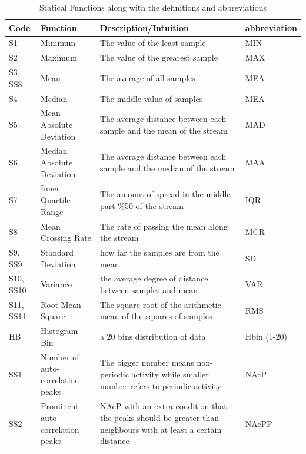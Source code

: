 \documentclass[journal,article,submit,moreauthors,pdftex]{Definitions/mdpi}
\begin{document}
\begin{table}[H]
	\caption{Statical Functions along with the definitions and abbreviations }
	\label{tab:feature_list}
	\centering
	\begin{tabular}{p{0.9cm}p{5cm}p{7cm}p{1.3cm}}
		\toprule
		\textbf{Code} & \textbf{Function} & \textbf{Description/Intuition} & \textbf{{\scriptsize abbreviation}} \\
		\midrule
		{\footnotesize S1}&Minimum & {\scriptsize The value of the least sample}& MIN\\
		S2&Maximum & {\scriptsize The value of the greatest sample}& MAX\\
		{\footnotesize S3, SS8}&Mean&  {\scriptsize The average of all samples}& MEA\\
		{\footnotesize S4}&Median&  {\scriptsize The middle value of samples}& MEA\\
		{\footnotesize S5}&{\footnotesize Mean Absolute Deviation}& {\scriptsize The average distance between each sample and the mean of the stream}& MAD\\
		{\footnotesize S6}&{\footnotesize Median Absolute Deviation}& {\scriptsize The average distance between each sample and the median of the stream}& MAA\\
		{\footnotesize S7}&Inner Quartile Range  & {\scriptsize The amount of spread in the middle part \%50 of the stream}& IQR\\
		{\footnotesize S8}&Mean Crossing Rate& {\scriptsize The rate of passing the mean along the stream}& MCR\\
		{\footnotesize S9, SS9}&Standard Deviation& {\scriptsize how far the samples are from the mean}& SD\\
		{\footnotesize S10, SS10}&Variance& {\scriptsize the average degree of distance between samples and mean}& VAR\\
		{\footnotesize S11, SS11}&Root Mean Square& {\scriptsize The square root of the arithmetic mean of the squares of samples}& RMS\\
		{\footnotesize HB}& Histogram Bin&{\scriptsize a 20 bins distribution of data } & Hbin (1-20) \\
		{\footnotesize SS1}&Number of auto-correlation peaks& {\scriptsize The bigger number means non-periodic activity while smaller number refers to periodic activity }& NAcP\\
		{\footnotesize SS2}&Prominent auto-correlation peaks&{\scriptsize NAcP with an extra condition that the peaks should be greater than neighbours with at least a certain distance} & NAcPP \\

\end{tabular}
\end{table}
\end{document}

